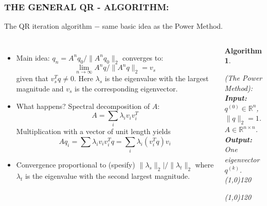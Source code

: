 \documentclass[a4paper,8pt]{beamer} %
\newcommand{\norm}[1]{\lVert{#1}\rVert}
\newtheorem{algo}{Algorithm}%
\begin{document}
\begin{frame} %
\frametitle{THE GENERAL QR - ALGORITHM:}
The QR iteration algorithm $-$ same basic idea as the Power Method.
%
%
\begin{columns}
%
%
\column{7cm}
\begin{itemize}
	\item Main idea: $q_n = A^n q_0 /  \norm{A^n q_0}_2$ converges to: 
		\[ \lim_{n\to\infty} A^n q / \norm{A^nq}_2 = v_s \]
		given that $v_s^Tq\neq0$.
		Here $\lambda_s$ is the eigenvalue with the largest magnitude
		and $v_s$ is the corresponding eigenvector. 
	\item What happens? Spectral decomposition of $A$:
		\[ A = \sum_i\lambda_i v_iv_i^T \]
		 Multiplication with a vector of unit length yields 
		\[ Aq_i = \sum \lambda_i v_iv_i^T q = \sum_i \lambda_i (v_i^Tq) v_i \]
	\item Convergence proportional to (spesify) $\norm{\lambda_s}_2|/\norm{\lambda_t}_2$
		where $\lambda_t$ is the eigenvalue with the second largest magnitude.
\end{itemize}
%
%
\column{5cm}
\begin{algo}
\begin{footnotesize}
{
%
	(The Power Method):
%
}\\
\textbf{Input: }
{
%
	\\$q^{(0)}\in\mathbb R^n$, $\norm{q}_2=1$.
	\\$A\in\mathbb R^{n\times n}$.
%
}\\
\textbf{Output: }
{
%
	\\One eigenvector $q^{(k)}$.
%
}\\
\line(1,0){120}
\begin{algorithmic}
%
	\State{$q^{(k)}\gets z/\norm{z}_2$}
\EndFor{}
%
\end{algorithmic}
\line(1,0){120}
\end{footnotesize}
\end{algo}
\end{columns}	
\end{frame} %
\end{document}
